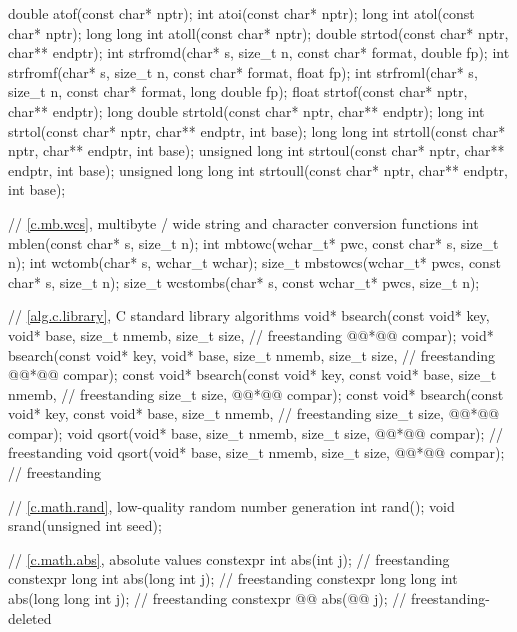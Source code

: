 \begin{codeblock}
{  double atof(const char* nptr);
  int atoi(const char* nptr);
  long int atol(const char* nptr);
  long long int atoll(const char* nptr);
  double strtod(const char* nptr, char** endptr);
  int strfromd(char* s, size_t n, const char* format, double fp);
  int strfromf(char* s, size_t n, const char* format, float fp);
  int strfroml(char* s, size_t n, const char* format, long double fp);
  float strtof(const char* nptr, char** endptr);
  long double strtold(const char* nptr, char** endptr);
  long int strtol(const char* nptr, char** endptr, int base);
  long long int strtoll(const char* nptr, char** endptr, int base);
  unsigned long int strtoul(const char* nptr, char** endptr, int base);
  unsigned long long int strtoull(const char* nptr, char** endptr, int base);

  // \ref{c.mb.wcs}, multibyte / wide string and character conversion functions
  int mblen(const char* s, size_t n);
  int mbtowc(wchar_t* pwc, const char* s, size_t n);
  int wctomb(char* s, wchar_t wchar);
  size_t mbstowcs(wchar_t* pwcs, const char* s, size_t n);
  size_t wcstombs(char* s, const wchar_t* pwcs, size_t n);

  // \ref{alg.c.library}, C standard library algorithms
  void* bsearch(const void* key, void* base, size_t nmemb, size_t size,         // freestanding
                @@*@\itcorr[-1]@ compar);
  void* bsearch(const void* key, void* base, size_t nmemb, size_t size,         // freestanding
                @@*@\itcorr[-1]@ compar);
  const void* bsearch(const void* key, const void* base, size_t nmemb,          // freestanding
                      size_t size, @@*@\itcorr[-1]@ compar);
  const void* bsearch(const void* key, const void* base, size_t nmemb,          // freestanding
                      size_t size, @@*@\itcorr[-1]@ compar);
  void qsort(void* base, size_t nmemb, size_t size, @@*@\itcorr[-1]@ compar);    // freestanding
  void qsort(void* base, size_t nmemb, size_t size, @@*@\itcorr[-1]@ compar);      // freestanding

  // \ref{c.math.rand}, low-quality random number generation
  int rand();
  void srand(unsigned int seed);

  // \ref{c.math.abs}, absolute values
  constexpr int abs(int j);                                             // freestanding
  constexpr long int abs(long int j);                                   // freestanding
  constexpr long long int abs(long long int j);                         // freestanding
  constexpr @@ abs(@@ j);            // freestanding-deleted

}
\end{codeblock}
